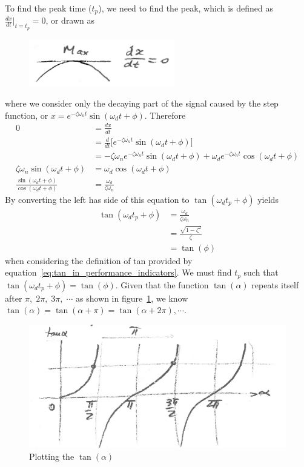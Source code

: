 \documentclass[12pt,letter]{article}
\numberwithin{ex}{section} %
\numberwithin{re}{section} %
\numberwithin{equation}{section}	%
\begin{document}
To find the peak time ($t_p$), we need to find the peak, which is defined as $\frac{dx}{dt}\big|_{t=t_p} = 0$, or drawn as
\begin{figure}[H]
	\centering
	\includegraphics[width=2.5in]{../figures/t_p_max.png}
\end{figure}
where we consider only the decaying part of the signal caused by the step function, or $x=e^{-\zeta \omega_n t} \sin (\omega_d t + \phi)$. Therefore
\begin{align}
0 &= \frac{dx}{dt}  \\
 &= \frac{d}{dt} \bigg[  e^{-\zeta \omega_n t} \sin (\omega_d t + \phi)   \bigg]  \nonumber \\
 &= - \zeta \omega_n e^{-\zeta \omega_n t} \sin (\omega_d t + \phi) + \omega_d e^{-\zeta \omega_n t} \cos (\omega_d t + \phi) \nonumber \\
\zeta \omega_n \sin (\omega_d t + \phi) &= \omega_d \cos (\omega_d t + \phi) \nonumber \\
\frac{\sin (\omega_d t + \phi)}{\cos (\omega_d t + \phi)} & = \frac{\omega_d}{\zeta \omega_n}  \nonumber
\end{align}
By converting the left has side of this equation to $\tan (\omega_d t_p + \phi)$ yields
\begin{align}
\label{eq:tan_of_phi}
\tan (\omega_d t_p + \phi) &= \frac{\omega_d}{\zeta \omega_n} \\
&= \frac{\sqrt{1-\zeta^2} }{\zeta} \nonumber \\
&= \tan(\phi) \nonumber
\end{align}
when considering the definition of tan provided by equation~\ref{eq:tan_in_performance_indicators}. We must find $t_p$ such that $\tan(\omega_d t_p + \phi) = \tan(\phi)$. Given that the function $\tan(\alpha)$ repeats itself after $\pi, \; 2\pi, \; 3\pi, \; \cdots$ as shown in figure~\ref{fig:tan_of_alpha}, we know $\tan(\alpha) = \tan(\alpha + \pi) = \tan(\alpha + 2\pi), \cdots $.  
\begin{figure}[H]
	\centering
	\includegraphics[width=4.5in]{../figures/tan_of_alpha.png}
	\caption{Plotting the $ \tan(\alpha)$}
	\label{fig:tan_of_alpha}
\end{figure}
\end{document}
